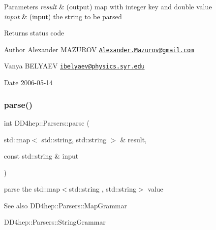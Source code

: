 \begin{DoxyParams}{Parameters}
{\em result} & (output) map with integer key and double value \\
\hline
{\em input} & (input) the string to be parsed \\
\hline
\end{DoxyParams}
\begin{DoxyReturn}{Returns}
status code
\end{DoxyReturn}
\begin{DoxyAuthor}{Author}
Alexander M\+A\+Z\+U\+R\+OV \href{mailto:Alexander.Mazurov@gmail.com}{\tt Alexander.\+Mazurov@gmail.\+com} 

Vanya B\+E\+L\+Y\+A\+EV \href{mailto:ibelyaev@physics.syr.edu}{\tt ibelyaev@physics.\+syr.\+edu} 
\end{DoxyAuthor}
\begin{DoxyDate}{Date}
2006-\/05-\/14 
\end{DoxyDate}
\hypertarget{namespace_d_d4hep_1_1_parsers_a5c68b3129b287e0e4c0a8aa6c97224d2}{}\label{namespace_d_d4hep_1_1_parsers_a5c68b3129b287e0e4c0a8aa6c97224d2} 
\subsubsection{\texorpdfstring{parse()}{parse()}\hspace{0.1cm}{\footnotesize\ttfamily [8/21]}}
{\footnotesize\ttfamily int D\+D4hep\+::\+Parsers\+::parse (\begin{DoxyParamCaption}\item[{std\+::map$<$ std\+::string, std\+::string $>$ \&}]{result,  }\item[{const std\+::string \&}]{input }\end{DoxyParamCaption})}



parse the {\ttfamily std\+::map$<$std\+::string , std\+::string$>$} value 

\begin{DoxySeeAlso}{See also}
D\+D4hep\+::\+Parsers\+::\+Map\+Grammar 

D\+D4hep\+::\+Parsers\+::\+String\+Grammar 
\end{DoxySeeAlso}

